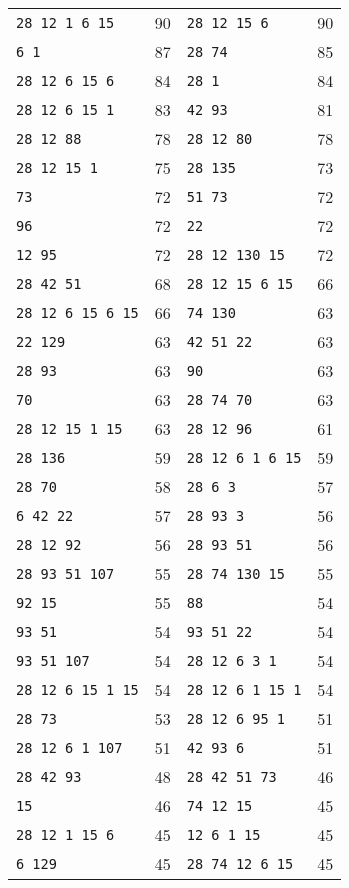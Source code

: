 \documentclass[letterpaper]{article} %
\begin{document}
\begin{table}[th]
\begin{tabular}{lclc}
\verb|28 12 1 6 15| & 90 & \verb|28 12 15 6| & 90 \\
\verb|6 1| & 87 & \verb|28 74| & 85 \\
\verb|28 12 6 15 6| & 84 & \verb|28 1| & 84 \\
\verb|28 12 6 15 1| & 83 & \verb|42 93| & 81 \\
\verb|28 12 88| & 78 & \verb|28 12 80| & 78 \\
\verb|28 12 15 1| & 75 & \verb|28 135| & 73 \\
\verb|73| & 72 & \verb|51 73| & 72 \\
\verb|96| & 72 & \verb|22| & 72 \\
\verb|12 95| & 72 & \verb|28 12 130 15| & 72 \\
\verb|28 42 51| & 68 & \verb|28 12 15 6 15| & 66 \\
\verb|28 12 6 15 6 15| & 66 & \verb|74 130| & 63 \\
\verb|22 129| & 63 & \verb|42 51 22| & 63 \\
\verb|28 93| & 63 & \verb|90| & 63 \\
\verb|70| & 63 & \verb|28 74 70| & 63 \\
\verb|28 12 15 1 15| & 63 & \verb|28 12 96| & 61 \\
\verb|28 136| & 59 & \verb|28 12 6 1 6 15| & 59 \\
\verb|28 70| & 58 & \verb|28 6 3| & 57 \\
\verb|6 42 22| & 57 & \verb|28 93 3| & 56 \\
\verb|28 12 92| & 56 & \verb|28 93 51| & 56 \\
\verb|28 93 51 107| & 55 & \verb|28 74 130 15| & 55 \\
\verb|92 15| & 55 & \verb|88| & 54 \\
\verb|93 51| & 54 & \verb|93 51 22| & 54 \\
\verb|93 51 107| & 54 & \verb|28 12 6 3 1| & 54 \\
\verb|28 12 6 15 1 15| & 54 & \verb|28 12 6 1 15 1| & 54 \\
\verb|28 73| & 53 & \verb|28 12 6 95 1| & 51 \\
\verb|28 12 6 1 107| & 51 & \verb|42 93 6| & 51 \\
\verb|28 42 93| & 48 & \verb|28 42 51 73| & 46 \\
\verb|15| & 46 & \verb|74 12 15| & 45 \\
\verb|28 12 1 15 6| & 45 & \verb|12 6 1 15| & 45 \\
\verb|6 129| & 45 & \verb|28 74 12 6 15| & 45 \\

\end{tabular}
\end{table}
\end{document}

